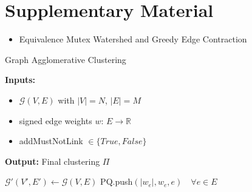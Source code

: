 
\section{Supplementary Material}
\begin{itemize}
\item Equivalence Mutex Watershed and Greedy Edge Contraction
\end{itemize}

\begin{algorithm}
  \caption{Graph Agglomerative Clustering}
\setlength{\parindent}{\algorithmicindent} \textbf{Inputs:}
     \begin{itemize}[leftmargin=1.3cm,topsep=0.1pt,itemsep=-1.ex]
   \item $\mathcal{G}(V,E)$ with $|V|=N$, $|E|=M$
   \item signed edge weights $w:\,E\rightarrow\mathbb{R}$
   \item {\color{blue}addMustNotLink} $\in \{ True, False\}$
   \end{itemize}
   \vspace{0.4em}
   
\setlength{\parindent}{\algorithmicindent} \textbf{Output:} Final clustering $\Pi$


  \hspace*{\algorithmicindent} 
  \begin{algorithmic}[1]


      \State $\mathcal{G}'(V', E') \gets \mathcal{G}(V, E)$  
        \State PQ.push$(|w_e|, w_e, e) \quad \forall e \in E $  
      

\end{algorithmic}
\end{algorithm}
